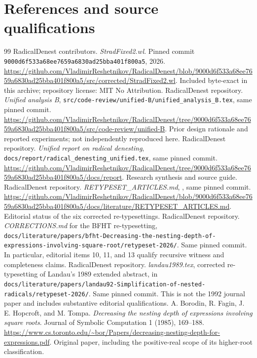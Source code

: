 \documentclass[11pt,a4paper]{article}
\newcommand{\code}[1]{\texttt{\detokenize{#1}}}
\theoremstyle{remark}\newtheorem{remark}[theorem]{Remark}
\begin{document}
\section{References and source qualifications}
\small
\begin{thebibliography}{99}
 RadicalDenest contributors. \emph{StradFixed2.wl}. Pinned commit \nolinkurl{9000d6f533a68ee7659a6830ad25bba401f800a5}, 2026. \url{https://github.com/VladimirReshetnikov/RadicalDenest/blob/9000d6f533a68ee7659a6830ad25bba401f800a5/src/corrected/StradFixed2.wl}. Included byte-exact in this archive; repository license: MIT No Attribution.
 RadicalDenest repository. \emph{Unified analysis B}, \nolinkurl{src/code-review/unified-B/unified_analysis_B.tex}, same pinned commit. \url{https://github.com/VladimirReshetnikov/RadicalDenest/tree/9000d6f533a68ee7659a6830ad25bba401f800a5/src/code-review/unified-B}. Prior design rationale and reported experiments; not independently reproduced here.
 RadicalDenest repository. \emph{Unified report on radical denesting}, \nolinkurl{docs/report/radical_denesting_unified.tex}, same pinned commit. \url{https://github.com/VladimirReshetnikov/RadicalDenest/tree/9000d6f533a68ee7659a6830ad25bba401f800a5/docs/report}. Research synthesis and source guide.
 RadicalDenest repository. \emph{RETYPESET\_ARTICLES.md}, \code{docs/literature}, same pinned commit. \url{https://github.com/VladimirReshetnikov/RadicalDenest/blob/9000d6f533a68ee7659a6830ad25bba401f800a5/docs/literature/RETYPESET_ARTICLES.md}. Editorial status of the six corrected re-typesettings.
 RadicalDenest repository. \emph{CORRECTIONS.md} for the BFHT re-typesetting, \nolinkurl{docs/literature/papers/bfht-Decreasing-the-nesting-depth-of-expressions-involving-square-root/retypeset-2026/}. Same pinned commit. In particular, editorial items 10, 11, and 13 qualify recursive witness and completeness claims.
 RadicalDenest repository. \emph{landau1989.tex}, corrected re-typesetting of Landau's 1989 extended abstract, in \nolinkurl{docs/literature/papers/landau92-Simplification-of-nested-radicals/retypeset-2026/}. Same pinned commit. This is not the 1992 journal paper and includes substantive editorial qualifications.
 A. Borodin, R. Fagin, J. E. Hopcroft, and M. Tompa. \emph{Decreasing the nesting depth of expressions involving square roots}. Journal of Symbolic Computation 1 (1985), 169--188. \url{https://www.cs.toronto.edu/~bor/Papers/decreasing-nesting-depth-for-expressions.pdf}. Original paper, including the positive-real scope of its higher-root classification.

\end{thebibliography}
\end{document}
